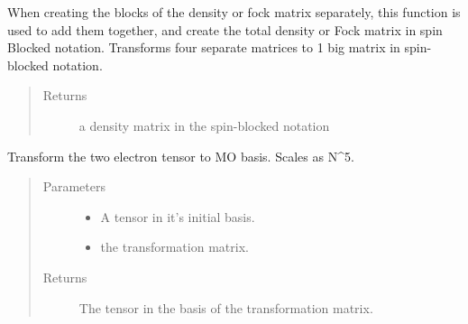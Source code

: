 \documentclass[letterpaper,10pt,english]{sphinxmanual}
\begin{document}
\begin{fulllineitems}
\label{\detokenize{transform:hf.utilities.transform.spin_blocked}}
When creating the blocks of the density or fock matrix separately, this function is used to add them together,
and create the total density or Fock matrix in spin Blocked notation. Transforms four separate matrices to 1 big
matrix in spin-blocked notation.
\begin{quote}\begin{description}
\item[{Returns}] \leavevmode
a density matrix in the spin-blocked notation

\end{description}\end{quote}

\end{fulllineitems}


\begin{fulllineitems}
\label{\detokenize{transform:hf.utilities.transform.tensor_basis_transform}}
Transform the two electron tensor to MO basis. Scales as N\textasciicircum{}5.
\begin{quote}\begin{description}
\item[{Parameters}] \leavevmode\begin{itemize}
\item {} 
 \textendash{} A tensor in it’s initial basis.

\item {} 
 \textendash{} the transformation matrix.

\end{itemize}

\item[{Returns}] \leavevmode
The tensor in the basis of the transformation matrix.

\end{description}\end{quote}

\end{fulllineitems}
\end{document}
